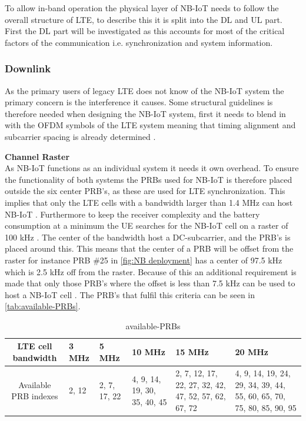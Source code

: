 To allow in-band operation the physical layer of \gls{NB-IoT} needs to follow the overall structure of \gls{LTE}, to describe this it is split into the \gls{DL} and \gls{UL} part. First the \gls{DL} part will be investigated as this accounts for most of the critical factors of the communication i.e. synchronization and system information. 

\subsubsection{Downlink}
As the primary users of legacy \gls{LTE} does not know of the \gls{NB-IoT} system the primary concern is the interference it causes. Some structural guidelines is therefore needed when designing the \gls{NB-IoT} system, first it needs to blend in with the \gls{OFDM} symbols of the \gls{LTE} system meaning that timing alignment and subcarrier spacing is already determined \citep[ch. 7.2]{NB-IoT_Book}. 

\textbf{Channel Raster}\\
As \gls{NB-IoT} functions as an individual system it needs it own overhead. To ensure the functionality of both systems the \gls{PRB}s used for \gls{NB-IoT} is therefore placed outside the six center \gls{PRB}'s, as these are used for LTE synchronization. This implies that only the LTE cells with a bandwidth larger than 1.4 MHz can host NB-IoT \citep{whitepaper}. Furthermore to keep the receiver complexity and the battery consumption at a minimum the \gls{UE} searches for the \gls{NB-IoT} cell on a raster of 100 kHz \citep[ch. 7.2]{NB-IoT_Book}. The center of the bandwidth host a DC-subcarrier, and the \gls{PRB}'s is placed around this. This means that the center of a PRB will be offset from the raster for instance PRB \#25 in \autoref{fig:NB deployment} has a center of 97.5 kHz which is 2.5 kHz off from the raster. Because of this an additional requirement is made that only those \gls{PRB}'s where the offset is less than 7.5 kHz can be used to host a NB-IoT cell \citep{primer}. The PRB's that fulfil this criteria can be seen in \autoref{tab:available-PRBs}. 

\begin{table}[H]
\centering
\begin{tabular}{|c|p{1.8cm}|p{1.8cm}|p{1.8cm}|p{1.8cm}|p{1.8cm}|}\hline
\textbf{LTE cell bandwidth}	& 3 MHz				& 5 MHz	& 10 MHz	& 15 MHz	& 20 MHz \\\hline
Available PRB indexes		& 2, 12	& 2, 7, 17, 22	& 4, 9, 14, 19, 30, 35, 40, 45 & 2, 7, 12, 17, 22, 27, 32, 42, 47, 52, 57, 62, 67, 72 & 4, 9, 14, 19, 24, 29, 34, 39, 44, 55, 60, 65, 70, 75, 80, 85, 90, 95 \\\hline
\end{tabular}
\caption{available-PRBs \citep{whitepaper}}
\label{tab:available-PRBs}
\end{table}


